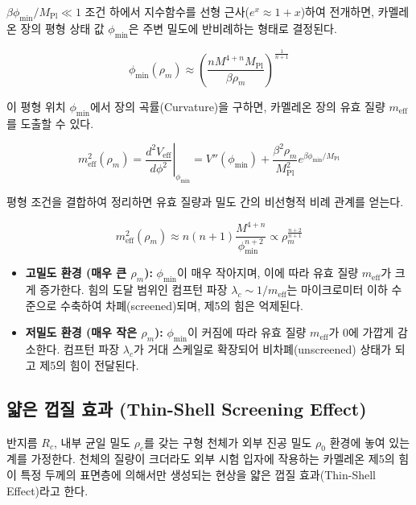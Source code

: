 \documentclass[11pt, a4paper]{article}
\begin{document}
$\beta \phi_{\text{min}} / M_{\text{Pl}} \ll 1$ 조건 하에서 지수함수를 선형 근사($e^x \approx 1+x$)하여 전개하면, 카멜레온 장의 평형 상태 값 $\phi_{\text{min}}$은 주변 밀도에 반비례하는 형태로 결정된다.

\begin{equation}
    \phi_{\text{min}}(\rho_m) \approx \left( \frac{n M^{4+n} M_{\text{Pl}}}{\beta \rho_m} \right)^{\frac{1}{n+1}}
\end{equation}

이 평형 위치 $\phi_{\text{min}}$에서 장의 곡률(Curvature)을 구하면, 카멜레온 장의 유효 질량 $m_{\text{eff}}$를 도출할 수 있다.

\begin{equation}
    m_{\text{eff}}^2(\rho_m) = \left. \frac{d^2 V_{\text{eff}}}{d\phi^2} \right|_{\phi_{\text{min}}} = V''(\phi_{\text{min}}) + \frac{\beta^2 \rho_m}{M_{\text{Pl}}^2} e^{\beta \phi_{\text{min}} / M_{\text{Pl}}}
\end{equation}

평형 조건을 결합하여 정리하면 유효 질량과 밀도 간의 비선형적 비례 관계를 얻는다.

\begin{equation}
    m_{\text{eff}}^2(\rho_m) \approx n(n+1)\frac{M^{4+n}}{\phi_{\text{min}}^{n+2}} \propto \rho_m^{\frac{n+2}{n+1}}
\end{equation}

\begin{tcolorbox}[colback=blue!5!white,colframe=blue!75!black,title=\textbf{유효 질량의 밀도 종속성과 차폐 현상}]
\begin{itemize}
    \item \textbf{고밀도 환경 (매우 큰 $\rho_m$):}
    $\phi_{\text{min}}$이 매우 작아지며, 이에 따라 유효 질량 $m_{\text{eff}}$가 크게 증가한다. 힘의 도달 범위인 컴프턴 파장 $\lambda_c \sim 1/m_{\text{eff}}$는 마이크로미터 이하 수준으로 수축하여 차폐(screened)되며, 제5의 힘은 억제된다.
    \item \textbf{저밀도 환경 (매우 작은 $\rho_m$):}
    $\phi_{\text{min}}$이 커짐에 따라 유효 질량 $m_{\text{eff}}$가 0에 가깝게 감소한다. 컴프턴 파장 $\lambda_c$가 거대 스케일로 확장되어 비차폐(unscreened) 상태가 되고 제5의 힘이 전달된다.
\end{itemize}
\end{tcolorbox}

\subsection{얇은 껍질 효과 (Thin-Shell Screening Effect)}
반지름 $R_c$, 내부 균일 밀도 $\rho_c$를 갖는 구형 천체가 외부 진공 밀도 $\rho_0$ 환경에 놓여 있는 계를 가정한다. 천체의 질량이 크더라도 외부 시험 입자에 작용하는 카멜레온 제5의 힘이 특정 두께의 표면층에 의해서만 생성되는 현상을 얇은 껍질 효과(Thin-Shell Effect)라고 한다.
\end{document}
